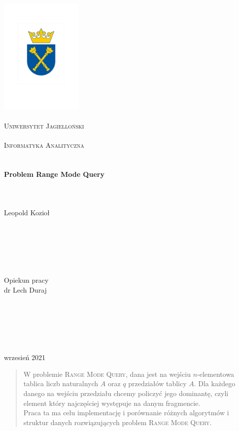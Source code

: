 \begin{center}
\thispagestyle{empty}
\vspace{-24em}
\includegraphics[trim=0 0 0 6cm,width=4cm]{images/logo.png}\\
\ \\
\vspace{-4em}
\LARGE{\textsc{Uniwersytet Jagielloński}}\\[-0.9ex]
\ \\
\Large{\textsc{Informatyka Analityczna}}\\[2ex]
\ \\
\ \\
\Huge{\textbf{Problem Range Mode Query}}
\ \\
\ \\
\ \\
\ \\
\Large{Leopold Kozioł}
\ \\
\ \\
\ \\
\ \\
\ \\
\ \\
\ \\

\Large{Opiekun pracy}\\
\Large{dr Lech Duraj}\\
\ \\
\ \\
\ \\
\ \\
\ \\
\ \\
\Large{wrzesień 2021}
\end{center}


\newpage
\thispagestyle{plain}
\begin{abstract}
\hspace{0.12\textwidth}\begin{minipage}[t]{0.6\textwidth}
    W problemie \textsc{Range Mode Query}, dana jest na wejściu $n$-elementowa tablica liczb naturalnych $A$ oraz $q$ przedziałów tablicy $A$. Dla każdego danego na wejściu przedziału chcemy policzyć jego dominantę, czyli element który najczęściej występuje na danym fragmencie.\\
    Praca ta ma celu implementację i porównanie różnych algorytmów i struktur danych rozwiązujących problem \textsc{Range Mode Query}.
\end{minipage}
\end{abstract}



\newpage
\tableofcontents